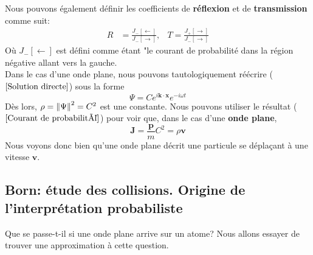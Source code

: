 \documentclass[../notesdecours]{subfiles}
\begin{document}
Nous pouvons également définir les coefficients de \textbf{réflexion} et de \textbf{transmission} comme suit:
\begin{align}
R &= \frac{J_- [\leftarrow]}{J_- [\rightarrow]},	&T = \frac{J_+ [\rightarrow]}{J_- [\rightarrow]}
\end{align}
Où $J_- [\leftarrow]$ est défini comme étant "le courant de probabilité dans la région négative allant vers la gauche.\\

Dans le cas d'une onde plane, nous pouvons tautologiquement réécrire ($\ref{Solution directe}$) sous la forme
\begin{equation}
\label{One plane forme}
\Psi = Ce^{i \bm{k} \cdot \bm{x}} e^{-i \omega t}
\end{equation}
Dès lors, $\rho = \norm{\Psi}^2 = C^2$ est une constante. Nous pouvons utiliser le résultat ($\ref{Courant de probabilité}$) pour voir que, dans le cas d'une \textbf{onde plane}, 
\begin{equation}
\bm{J} = \frac{\bm{p}}{m} C^2 = \rho\bm{v}
\end{equation}
Nous voyons donc bien qu'une onde plane décrit une particule se déplaçant à une vitesse $\bm{v}$.
\subsection{Born: étude des collisions. Origine de l'interprétation probabiliste}
Que se passe-t-il si une onde plane arrive sur un atome? Nous allons essayer de trouver une approximation à cette question.\\
\end{document}
